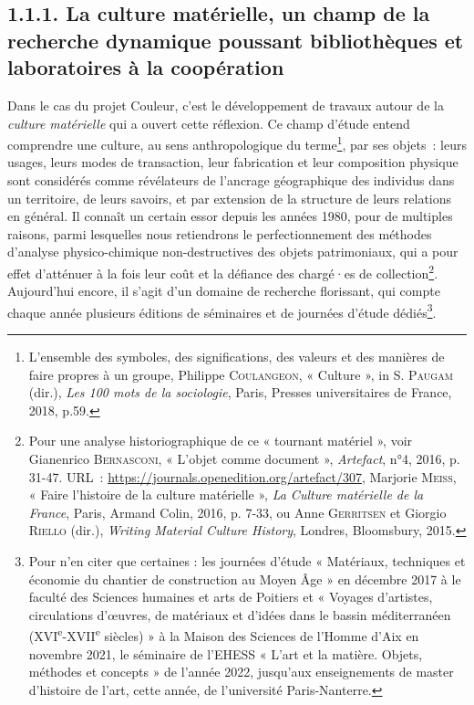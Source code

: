 \documentclass[a4paper,12pt, twoside]{book}
\begin{document}
\subsection*{1.1.1. La culture matérielle, un champ de la recherche dynamique poussant bibliothèques et laboratoires à la coopération}

Dans le cas du projet Couleur, c’est le développement de travaux autour de la \textit{culture matérielle} qui a ouvert cette réflexion. Ce champ d’étude entend comprendre une culture, au sens anthropologique du terme\footnote{L’ensemble des symboles, des significations, des valeurs et des manières de faire propres à un groupe, Philippe \textsc{Coulangeon}, « Culture », in S. \textsc{Paugam} (dir.), \textit{Les 100 mots de la sociologie}, Paris, Presses universitaires de France, 2018, p.59.}, par ses objets~: leurs usages, leurs modes de transaction, leur fabrication et leur composition physique sont considérés comme révélateurs de l’ancrage géographique des individus dans un territoire, de leurs savoirs, et par extension de la structure de leurs relations en général. Il connaît un certain essor depuis les années 1980, pour de multiples raisons, parmi lesquelles nous retiendrons le perfectionnement des méthodes d’analyse physico-chimique non-destructives des objets patrimoniaux, qui a pour effet d’atténuer à la fois leur coût et la défiance des chargé·es de collection\footnote{Pour une analyse historiographique de ce « tournant matériel », voir Gianenrico \textsc{Bernasconi}, « L’objet comme document », \textit{Artefact}, n°4, 2016, p. 31-47. URL~: \url{https://journals.openedition.org/artefact/307}, Marjorie \textsc{Meiss}, « Faire l’histoire de la culture matérielle », \textit{La Culture matérielle de la France}, Paris, Armand Colin, 2016, p. 7-33, ou Anne \textsc{Gerritsen} et Giorgio \textsc{Riello} (dir.), \textit{Writing Material Culture History}, Londres, Bloomsbury, 2015.}. Aujourd’hui encore, il s’agit d’un domaine de recherche florissant, qui compte chaque année plusieurs éditions de séminaires et de journées d’étude dédiés\footnote{Pour n’en citer que certaines : les journées d’étude « Matériaux, techniques et économie du chantier de construction au Moyen Âge » en décembre 2017 à le faculté des Sciences humaines et arts de Poitiers et « Voyages d’artistes, circulations d’œuvres, de matériaux et d’idées dans le bassin méditerranéen (XVI\textsuperscript{e}-XVII\textsuperscript{e} siècles) » à la Maison des Sciences de l’Homme d’Aix en novembre 2021, le séminaire de l’EHESS « L’art et la matière. Objets, méthodes et concepts » de l’année 2022, jusqu’aux enseignements de master d’histoire de l’art, cette année, de l’université Paris-Nanterre.}.
\end{document}
